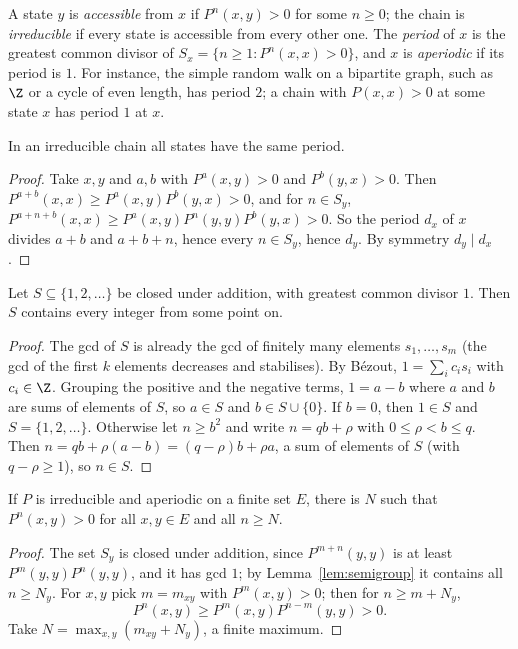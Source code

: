A state $y$ is \emph{accessible} from $x$ if $P^n(x,y)>0$ for some $n\ge0$; the chain is \emph{irreducible} if every state is accessible from
every other one. The \emph{period} of $x$ is the greatest common divisor of $S_x=\{n\ge1:P^n(x,x)>0\}$, and $x$ is \emph{aperiodic} if its period is $1$. For
instance, the simple random walk on a bipartite graph, such as $\Z$ or a cycle of even length, has period $2$; a chain with
$P(x,x)>0$ at some state $x$ has period $1$ at $x$.

\begin{lemma}\label{lem:period}
In an irreducible chain all states have the same period.
\end{lemma}
\begin{proof}
Take $x,y$ and $a,b$ with $P^a(x,y)>0$ and $P^b(y,x)>0$. Then $P^{a+b}(x,x)\ge P^a(x,y)P^b(y,x)>0$, and for $n\in S_y$, $P^{a+n+b}(x,x)\ge P^a(x,y)P^n(y,y)P^b(y,x)>0$. So the
period $d_x$ of $x$ divides $a+b$ and $a+b+n$, hence every $n\in S_y$, hence $d_y$. By symmetry $d_y\mid d_x$.
\end{proof}

\begin{lemma}\label{lem:semigroup}
Let $S\subseteq\{1,2,\ldots\}$ be closed under addition, with greatest common divisor $1$. Then $S$ contains every integer from some
point on.
\end{lemma}
\begin{proof}
The gcd of $S$ is already the gcd of finitely many elements $s_1,\dots,s_m$ (the gcd of the first $k$ elements decreases and
stabilises). By Bézout, $1=\sum_ic_is_i$ with $c_i\in\Z$. Grouping the positive and the negative terms, $1=a-b$ where $a$ and $b$ are sums of
elements of $S$, so $a\in S$ and $b\in S\cup\{0\}$. If $b=0$, then $1\in S$ and $S=\{1,2,\ldots\}$. Otherwise let $n\ge b^2$ and write $n=qb+\rho$ with $0\le\rho<b\le q$.
Then $n=qb+\rho(a-b)=(q-\rho)b+\rho a$, a sum of elements of $S$ (with $q-\rho\ge1$), so $n\in S$.
\end{proof}

\begin{proposition}\label{prop:primitive}
If $P$ is irreducible and aperiodic on a finite set $E$, there is $N$ such that $P^n(x,y)>0$ for all $x,y\in E$ and all $n\ge N$.
\end{proposition}
\begin{proof}
The set $S_y$ is closed under addition, since $P^{m+n}(y,y)$ is at least $P^m(y,y)P^n(y,y)$, and it has gcd $1$; by Lemma~\ref{lem:semigroup} it contains all $n\ge N_y$. For $x,y$ pick $m=m_{xy}$ with
$P^m(x,y)>0$; then for $n\ge m+N_y$,
\[
P^n(x,y)\ge P^m(x,y)P^{n-m}(y,y)>0.
\] Take $N=\max_{x,y}(m_{xy}+N_y)$, a finite maximum.
\end{proof}

